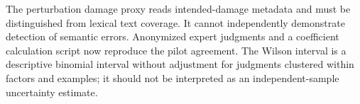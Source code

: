The perturbation damage proxy reads intended-damage metadata and must be distinguished from lexical text coverage. It cannot independently demonstrate detection of semantic errors. Anonymized expert judgments and a coefficient calculation script now reproduce the pilot agreement. The Wilson interval is a descriptive binomial interval without adjustment for judgments clustered within factors and examples; it should not be interpreted as an independent-sample uncertainty estimate.
